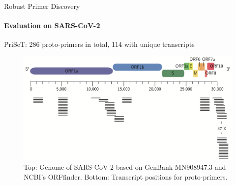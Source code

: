 \documentclass[xcolor=dvipsnames,envcountsect]{beamer}
\begin{document}
\begin{frame}{Robust Primer Discovery}
\framesubtitle{Evaluation on SARS-CoV-2}
PriSeT: 286 proto-primers in total, 114 with unique transcripts
\begin{figure}\centering
    \includegraphics[scale=.4]{sarscov2_genome}
    \caption{Top: Genome of SARS-CoV-2 based on GenBank MN908947.3 and NCBI’s ORFfinder. Bottom: Transcript positions for proto-primers.} %
\end{figure}
\end{frame}


   
  
\end{document}
